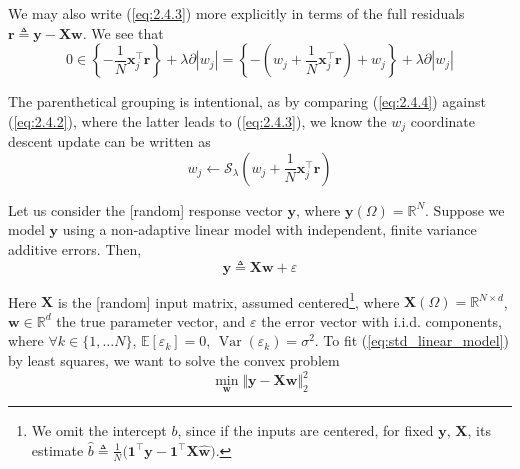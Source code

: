 \documentclass{article}
\numberwithin{equation}{section}
\begin{document}
We may also write (\ref{eq:2.4.3}) more explicitly in terms of the full
residuals $ \mathbf{r} \triangleq \mathbf{y} - \mathbf{Xw} $. We see that
\begin{equation} \label{eq:2.4.4}
    0 \in \left\{-\frac{1}{N}\mathbf{x}_j^\top\mathbf{r}\right\} +
    \lambda\partial|w_j| =
    \left\{
        -\left(w_j + \frac{1}{N}\mathbf{x}_j^\top\mathbf{r}\right) + w_j
    \right\} +
    \lambda\partial|w_j|
\end{equation}

The parenthetical grouping is intentional, as by comparing (\ref{eq:2.4.4})
against (\ref{eq:2.4.2}), where the latter leads to (\ref{eq:2.4.3}), we know
the $ w_j $ coordinate descent update can be written as
\begin{equation*}
    w_j \leftarrow \mathcal{S}_\lambda\left(
        w_j + \frac{1}{N}\mathbf{x}_j^\top\mathbf{r}
    \right)
\end{equation*}


Let us consider the [random] response vector $ \mathbf{y} $, where
$ \mathbf{y}(\Omega) = \mathbb{R}^N $. Suppose we model $ \mathbf{y} $
using a non-adaptive linear model with independent, finite variance
additive errors. Then,
\begin{equation} \label{eq:std_linear_model}
    \mathbf{y} \triangleq \mathbf{Xw} + \varepsilon
\end{equation}

Here $ \mathbf{X} $ is the [random] input matrix, assumed
centered\footnote{
    We omit the intercept $ b $, since if the inputs are centered, for
    fixed $ \mathbf{y} $, $ \mathbf{X} $, its estimate $ \hat{b} \triangleq
    \frac{1}{N}\big(\mathbf{1}^\top\mathbf{y} -
    \mathbf{1}^\top\mathbf{X}\hat{\mathbf{w}}\big) $.
}, where $ \mathbf{X}(\Omega) = \mathbb{R}^{N \times d} $, $ \mathbf{w} \in
\mathbb{R}^d $ the true parameter vector, and $ \varepsilon $ the error
vector with i.i.d. components, where $ \forall k \in\{1, \ldots N\} $,
$ \mathbb{E}[\varepsilon_k] = 0 $, $ \operatorname{Var}(\varepsilon_k) =
\sigma^2 $. To fit (\ref{eq:std_linear_model}) by least squares, we want to
solve the convex problem
\begin{equation} \label{eq:std_linear_lsq}
    \min_\mathbf{w}\Vert\mathbf{y} - \mathbf{Xw}\Vert_2^2
\end{equation}
\end{document}
